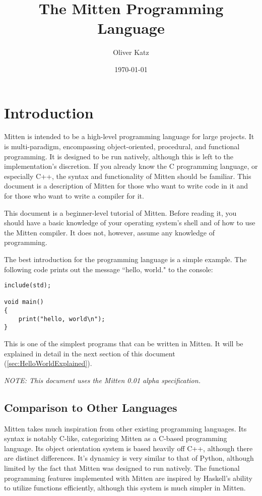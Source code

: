 \documentclass[10pt,a4paper]{article}
\title{The Mitten Programming Language}
\author{Oliver Katz}
\date{\today}
\begin{document}
\maketitle
\tableofcontents
\newpage

\section{Introduction}
Mitten is intended to be a high-level programming language for large projects. It is multi-paradigm, encompassing object-oriented, procedural, and functional programming. It is designed to be run natively, although this is left to the implementation's discretion. If you already know the C programming language, or especially C++, the syntax and functionality of Mitten should be familiar. This document is a description of Mitten for those who want to write code in it and for those who want to write a compiler for it.

This document is a beginner-level tutorial of Mitten. Before reading it, you should have a basic knowledge of your operating system's shell and of how to use the Mitten compiler. It does not, however, assume any knowledge of programming.

The best introduction for the programming language is a simple example. The following code prints out the message ``hello, world." to the console:
\begin{verbatim}
include(std);

void main()
{
    print("hello, world\n");
}
\end{verbatim}

This is one of the simplest programs that can be written in Mitten. It will be explained in detail in the next section of this document (\ref{sec:HelloWorldExplained}).

\textit{NOTE: This document uses the Mitten 0.01 alpha specification.}

\subsection{Comparison to Other Languages}
Mitten takes much inspiration from other existing programming languages. Its syntax is notably C-like, categorizing Mitten as a C-based programming language. Its object orientation system is based heavily off C++, although there are distinct differences. It's dynamicy is very similar to that of Python, although limited by the fact that Mitten was designed to run natively. The functional programming features implemented with Mitten are inspired by Haskell's ability to utilize functions efficiently, although this system is much simpler in Mitten.
\end{document}
